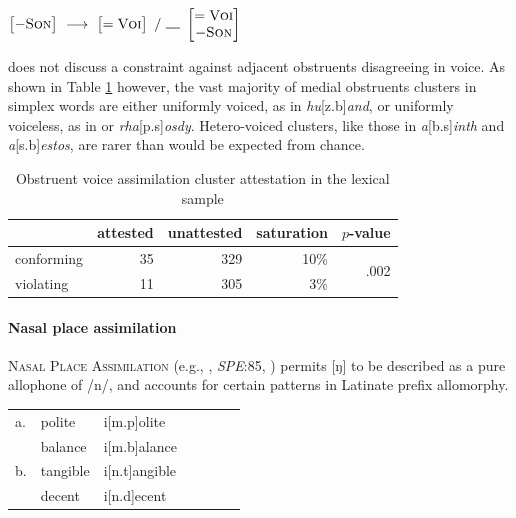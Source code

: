 \begin{example}
\label{ovarule}
$\begin{bmatrix} -\textsc{Son} \end{bmatrix}~\goesto~\begin{bmatrix} =\textsc{Voi} \end{bmatrix}~/~\gap~\begin{bmatrix} =\textsc{Voi} \\ -\textsc{Son} \end{bmatrix}$
\end{example}

\noindent
\citet{Pierrehumbert1994} does not discuss a constraint against adjacent obstruents disagreeing in voice. 
As shown in Table \ref{ovatab} however, the vast majority of medial obstruents clusters in simplex words are either uniformly voiced, as in \emph{hu}[z.b]\emph{and}, or uniformly voiceless, as in or \emph{rha}[p.s]\emph{osdy}. Hetero-voiced clusters, like those in \emph{a}[b.s]\emph{inth} and \emph{a}[s.b]\emph{estos}, are rarer than would be expected from chance.

\begin{table}
\centering
\begin{tabular}{l rrrr}
\toprule
           & attested & unattested & saturation & $p$-value \\
\midrule
conforming & 35       & 329        & 10\%       & \multirow{2}{*}{.002} \\
violating  & 11       & 305        &  3\%       \\
\bottomrule
\end{tabular}
\caption{Obstruent voice assimilation cluster attestation in the lexical sample}
\label{ovatab}
\end{table}

\paragraph{Nasal place assimilation}
\label{npa}

\textsc{Nasal Place Assimilation} (e.g., \citealt[65f.]{Borowsky1986}, \emph{SPE}:85, \citealt[62]{Halle1985a}) permits [ŋ] to be described as a pure allophone of /n/, and accounts for certain patterns in Latinate prefix allomorphy.

\begin{example}
\label{nparule}
\begin{tabular}{l l l l l l l}
a. & {polite}   & {i}[m.p]{olite}   \\
   & {balance}  & {i}[m.b]{alance}  \\
b. & {tangible} & {i}[n.t]{angible} \\
   & {decent}   & {i}[n.d]{ecent}   \\
\end{tabular}
\end{example}

